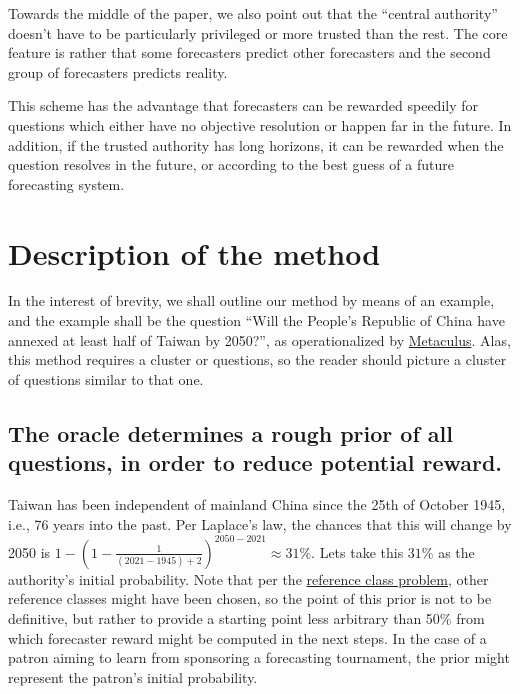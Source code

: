 \documentclass[]{article}
\begin{document}
Towards the middle of the paper, we also point out that the ``central
authority'' doesn't have to be particularly privileged or more trusted
than the rest. The core feature is rather that some forecasters predict
other forecasters and the second group of forecasters predicts reality.

This scheme has the advantage that forecasters can be rewarded speedily
for questions which either have no objective resolution or happen far in
the future. In addition, if the trusted authority has long horizons, it
can be rewarded when the question resolves in the future, or according
to the best guess of a future forecasting system.

\hypertarget{description-of-the-method}{%
\section{Description of the method}\label{description-of-the-method}}

In the interest of brevity, we shall outline our method by means of an
example, and the example shall be the question ``Will the People's
Republic of China have annexed at least half of Taiwan by 2050?'', as
operationalized by
\href{https://www.metaculus.com/questions/5320/chinese-annexation-of-most-of-taiwan-by-2050/}{Metaculus}.
Alas, this method requires a cluster or questions, so the reader should
picture a cluster of questions similar to that one.

\hypertarget{the-oracle-determines-a-rough-prior-of-all-questions-in-order-to-reduce-potential-reward.}{%
\subsection{The oracle determines a rough prior of all questions, in
order to reduce potential
reward.}\label{the-oracle-determines-a-rough-prior-of-all-questions-in-order-to-reduce-potential-reward.}}

Taiwan has been independent of mainland China since the 25th of October
1945, i.e., 76 years into the past. Per Laplace's law, the chances that
this will change by 2050 is
\(1-(1-\frac{1}{(2021-1945)+2})^{2050-2021} \approx 31\%\). Lets take
this \(31\%\) as the authority's initial probability. Note that per the
\href{https://en.wikipedia.org/wiki/Reference_class_problem}{reference
class problem}, other reference classes might have been chosen, so the
point of this prior is not to be definitive, but rather to provide a
starting point less arbitrary than 50\% from which forecaster reward
might be computed in the next steps. In the case of a patron aiming to
learn from sponsoring a forecasting tournament, the prior might
represent the patron's initial probability.
\end{document}
